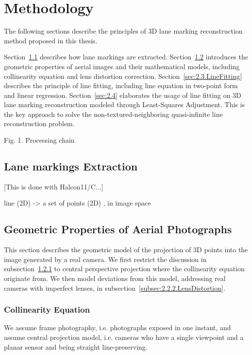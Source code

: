 
\chapter{Methodology}
\label{chap:k2}

The following sections describe the principles of 3D lane marking reconstruction method proposed in this thesis. 

Section~\ref{sec:2.1.LineExtraction} describes how lane markings are extracted.
Section~\ref{sec:2.2.Geometry} introduces the geometric properties of aerial images and their mathematical models, including collinearity equation and lens distortion correction. 
Section~\ref{sec:2.3.LineFitting} describes the principle of line fitting, including line equation in two-point form and linear regression.
Section~\ref{sec:2.4} elaborates the usage of line fitting on 3D lane marking reconstruction modeled through Least-Squares Adjustment. This is the key approach to solve the non-textured-neighboring quasi-infinite line reconstruction problem.




Fig. 1. Processing chain


\section{Lane markings Extraction}
\label{sec:2.1.LineExtraction}
[This is done with Halcon11/C...]

line (2D) -> a set of points (2D) , in image space

\section{Geometric Properties of Aerial Photographs}
\label{sec:2.2.Geometry}

This section describes the geometric model of the projection of 3D points into the image generated by a real camera. We first restrict the discussion in subsection~\ref{subsec:2.2.1.Collinearity} to central perspective projection where the collinearity equation originate from. We then model deviations from this model, addressing real cameras with imperfect lenses, in subsection~\ref{subsec:2.2.2.LensDistortion}.

\subsection{Collinearity Equation}
\label{subsec:2.2.1.Collinearity}
We assume frame photography, i.e. photographs exposed in one instant, and assume central projection model, i.e. cameras who have a single viewpoint and a planar sensor and being straight line-preserving.

